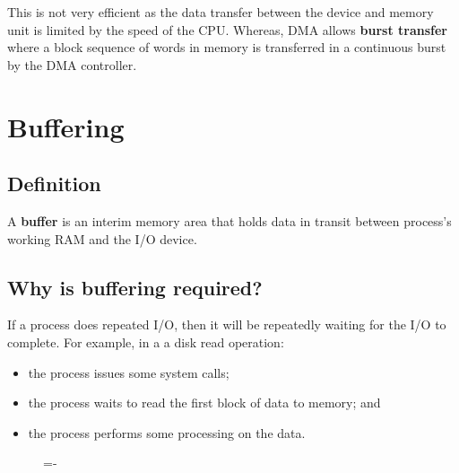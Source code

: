 \documentclass[a4paper]{systems-software}
\begin{document}
This is not very efficient as the data transfer between the device and memory unit is limited by the speed of the CPU. Whereas, DMA allows \textbf{burst transfer} where a block sequence of words in memory is transferred in a continuous burst by the DMA controller.


\section*{Buffering}

\subsection*{Definition}

A \textbf{buffer} is an interim memory area that holds data in transit between process's working RAM and the I/O device.

\subsection*{Why is buffering required?}

If a process does repeated I/O, then it will be repeatedly waiting for the I/O to complete. For example, in a a disk read operation:
\begin{itemize}
	\item the process issues some system calls;
	\item the process waits to read the first block of data to memory; and
	\item the process performs some processing on the data.
\end{itemize}

\begin{figure}[H]
  \lineskip=-\fboxrule
\end{figure}
\end{document}
